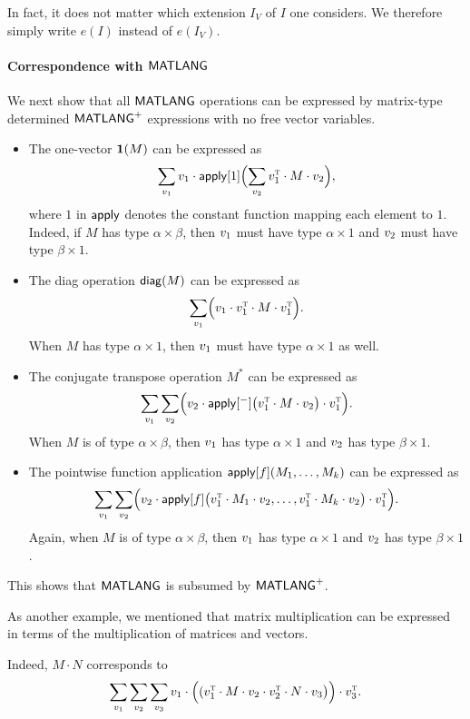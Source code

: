 In fact, it does not matter which extension $I_V$ of $I$ one considers. We therefore
simply write $e(I)$ instead of $e(I_V)$.

\paragraph{Correspondence with $\mathsf{MATLANG}$}
We next show that all $\mathsf{MATLANG}$ operations can be expressed by matrix-type determined $\mathsf{MATLANG}^{\sf +}$ expressions with no
free vector variables.

\begin{itemize}
\item The one-vector $\mathbf{1}(M)$ can be expressed as 
$$
\sum_{v_1} v_1\cdot  \mathsf{apply}[1]\Bigl(\sum_{v_2} v_1^{\textsc{t}}\cdot M\cdot v_2\Bigr),
$$
where $1$ in $\mathsf{apply}$ denotes the constant function mapping each element to $1$. Indeed, if $M$ has type
$\alpha\times\beta$, then $v_1$ must have type $\alpha\times 1$ and $v_2$ must  have type $\beta\times 1$. 
\item The diag operation $\mathsf{diag}(M)$ can be expressed as 
$$
\sum_{v_1} \Bigl(v_1\cdot v_1^{\textsc{t}}\cdot M \cdot v_1^{\textsc{t}}\Bigr). 
$$
When $M$ has type $\alpha\times 1$, then $v_1$ must have type $\alpha\times 1$ as well.
\item The conjugate transpose operation $M^*$ can be expressed as 
$$
\sum_{v_1}\sum_{v_2} \Bigl(v_2\cdot\mathsf{apply}[^-]\bigl(v_1^{\textsc{t}}\cdot M\cdot v_2\bigr)\cdot v_1^{\textsc{t}}\Bigr).
$$
When $M$ is of type $\alpha\times\beta$, then $v_1$ has type $\alpha\times 1$ and $v_2$ has type $\beta\times 1$.
\item The pointwise function application $\mathsf{apply}[f](M_1,\ldots,M_k)$ can be expressed as 
$$
\sum_{v_1}\sum_{v_2} \Bigl(v_2\cdot\mathsf{apply}[f]\bigl(v_1^{\textsc{t}}\cdot M_1\cdot v_2,\ldots,v_1^{\textsc{t}}\cdot M_k\cdot v_2\bigr)\cdot v_1^{\textsc{t}}\Bigr).
$$
Again, when $M$ is of type $\alpha\times\beta$, then $v_1$ has type $\alpha\times 1$ and $v_2$ has type $\beta\times 1$.
\end{itemize}
This shows that $\mathsf{MATLANG}$ is subsumed by $\mathsf{MATLANG}^{\sf +}$.


As another example, we mentioned that matrix multiplication can be expressed in terms of the multiplication of matrices and vectors.
\begin{example}
Indeed, $M\cdot N$ corresponds to
$$
\sum_{v_1}\sum_{v_2} \sum_{v_3} v_1 \cdot\Bigl( (v_1^{\textsc{t}}\cdot M\cdot v_2\cdot v_2^{\textsc{t}}\cdot N\cdot v_3\bigr)\Bigr)\cdot v_3^{\textsc{t}}.
$$
\end{example}

